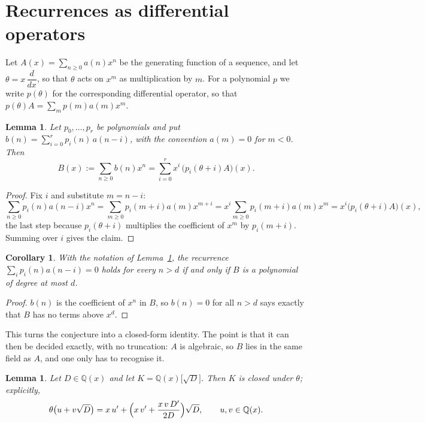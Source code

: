 \documentclass[11pt,a4paper]{article}
\theoremstyle{plain}
\newtheorem{lemma}[theorem]{Lemma}
\newtheorem{corollary}[theorem]{Corollary}
\theoremstyle{definition}
\begin{document}
\section{Recurrences as differential operators}

Let $A(x)=\sum_{n\ge0}a(n)x^{n}$ be the generating function of a sequence, and let
$\theta=x\,\dfrac{d}{dx}$, so that $\theta$ acts on $x^{m}$ as multiplication by $m$. For a
polynomial $p$ we write $p(\theta)$ for the corresponding differential operator, so that
$p(\theta)A=\sum_{m}p(m)a(m)x^{m}$.

\begin{lemma}\label{lem:transfer}
Let $p_{0},\dots,p_{r}$ be polynomials and put $b(n)=\sum_{i=0}^{r}p_{i}(n)\,a(n-i)$, with
the convention $a(m)=0$ for $m<0$. Then
\[
B(x):=\sum_{n\ge0}b(n)x^{n}=\sum_{i=0}^{r}x^{i}\,\bigl(p_{i}(\theta+i)A\bigr)(x).
\]
\end{lemma}

\begin{proof}
Fix $i$ and substitute $m=n-i$:
\[
\sum_{n\ge0}p_{i}(n)a(n-i)x^{n}=\sum_{m\ge0}p_{i}(m+i)a(m)x^{m+i}
=x^{i}\sum_{m\ge0}p_{i}(m+i)a(m)x^{m}=x^{i}\bigl(p_{i}(\theta+i)A\bigr)(x),
\]
the last step because $p_{i}(\theta+i)$ multiplies the coefficient of $x^{m}$ by
$p_{i}(m+i)$. Summing over $i$ gives the claim.
\end{proof}

\begin{corollary}\label{cor:criterion}
With the notation of Lemma~\ref{lem:transfer}, the recurrence
$\sum_{i}p_{i}(n)a(n-i)=0$ holds for every $n>d$ if and only if $B$ is a polynomial of
degree at most $d$.
\end{corollary}

\begin{proof}
$b(n)$ is the coefficient of $x^{n}$ in $B$, so $b(n)=0$ for all $n>d$ says exactly that
$B$ has no terms above $x^{d}$.
\end{proof}

This turns the conjecture into a closed-form identity. The point is that it can then be
decided exactly, with no truncation: $A$ is algebraic, so $B$ lies in the same field as
$A$, and one only has to recognise it.

\begin{lemma}\label{lem:field}
Let $D\in\mathbb{Q}(x)$ and let $K=\mathbb{Q}(x)\bigl[\sqrt{D}\bigr]$. Then $K$ is closed
under $\theta$; explicitly,
\[
\theta\bigl(u+v\sqrt{D}\bigr)=x\,u'+\Bigl(x\,v'+\frac{x\,v\,D'}{2D}\Bigr)\sqrt{D},
\qquad u,v\in\mathbb{Q}(x).
\]
\end{lemma}
\end{document}
